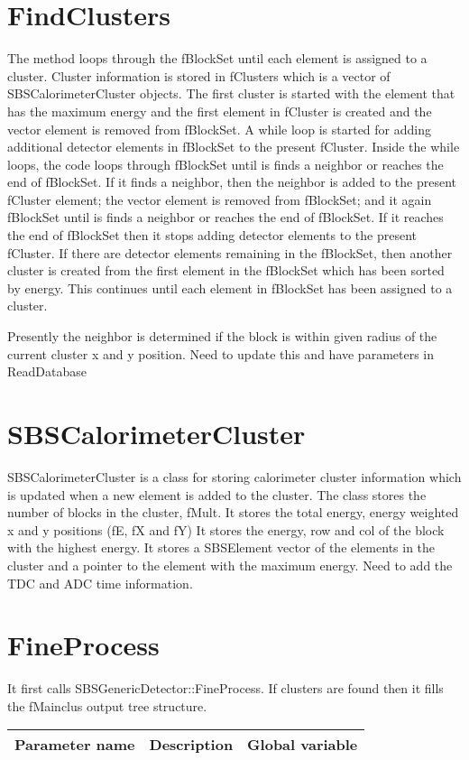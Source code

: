 \documentclass[11pt]{article}
\begin{document}
\section{FindClusters}
The method loops through the fBlockSet until each element is assigned to a cluster.
Cluster information is stored in fClusters which is a vector of SBSCalorimeterCluster objects.
The first cluster is started with the element that has the maximum energy and the first
element in fCluster is created and the vector element is removed from fBlockSet.
A while loop is started for adding additional detector elements in fBlockSet to the present fCluster.
Inside the while loops, the code loops through fBlockSet until is finds a neighbor or 
reaches the end of fBlockSet.
If it finds a neighbor, then the neighbor is added to the present fCluster element; 
the vector element is removed from fBlockSet; and it again fBlockSet until is finds a neighbor or 
reaches the end of fBlockSet.
If it reaches the end of  fBlockSet then it stops adding detector elements to the present fCluster.
If there are detector elements remaining in the fBlockSet, then another cluster is created from the
first element in the fBlockSet which has been sorted by energy. 
 This continues until  each element in fBlockSet has been assigned to a cluster.
 
 Presently the neighbor is determined if the block is within given radius of the current cluster x and y
 position. {\color{red} Need to update this and have parameters in ReadDatabase}
 
 \section{SBSCalorimeterCluster}
 SBSCalorimeterCluster is a class for storing calorimeter cluster information which is updated 
 when a new element is added to the cluster.
 The class stores the number of blocks in the cluster, fMult. It stores the total energy, energy weighted x
 and y positions (fE, fX and fY)  
 It stores the energy, row and col of the block with the highest energy.
 It stores a SBSElement vector of the elements in the cluster and a pointer to the element with the maximum energy.
 {\color{red} Need to add the TDC and ADC time information. } 
 
 
\section{FineProcess}
It first calls SBSGenericDetector::FineProcess.
If clusters are found then it fills the fMainclus output tree structure.
\begin{table}[h]
	\begin{center}
		\begin{tabularx}{\textwidth}{|c|X|c|}
			\hline 
			Parameter name	& Description &  Global variable\\ 
			\hline
\end{tabularx} 
\end{center}
\end{table}
\end{document}
